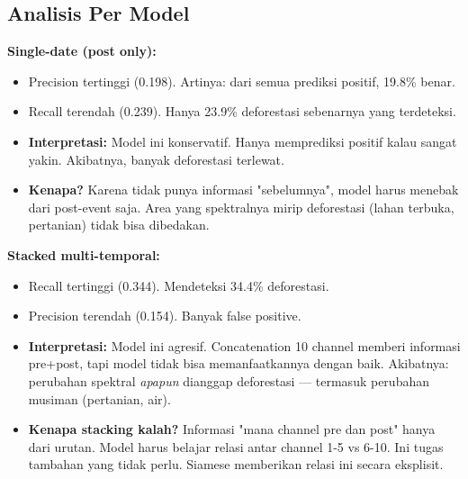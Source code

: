 \documentclass[10pt,a4paper,onecolumn]{article}
\begin{document}
\subsection{Analisis Per Model}

\textbf{Single-date (post only):}
\begin{itemize}[nosep]
    \item Precision tertinggi (0.198). Artinya: dari semua prediksi
          positif, 19.8\% benar.
    \item Recall terendah (0.239). Hanya 23.9\% deforestasi
          sebenarnya yang terdeteksi.
    \item \textbf{Interpretasi:} Model ini konservatif. Hanya
          memprediksi positif kalau sangat yakin. Akibatnya, banyak
          deforestasi terlewat.
    \item \textbf{Kenapa?} Karena tidak punya informasi "sebelumnya",
          model harus menebak dari post-event saja. Area yang
          spektralnya mirip deforestasi (lahan terbuka, pertanian)
          tidak bisa dibedakan.
\end{itemize}

\textbf{Stacked multi-temporal:}
\begin{itemize}[nosep]
    \item Recall tertinggi (0.344). Mendeteksi 34.4\% deforestasi.
    \item Precision terendah (0.154). Banyak false positive.
    \item \textbf{Interpretasi:} Model ini agresif. Concatenation
          10 channel memberi informasi pre+post, tapi model tidak
          bisa memanfaatkannya dengan baik. Akibatnya: perubahan
          spektral \textit{apapun} dianggap deforestasi — termasuk
          perubahan musiman (pertanian, air).
    \item \textbf{Kenapa stacking kalah?} Informasi "mana channel pre
          dan post" hanya dari urutan. Model harus belajar relasi
          antar channel 1-5 vs 6-10. Ini tugas tambahan yang tidak
          perlu. Siamese memberikan relasi ini secara eksplisit.
\end{itemize}
\end{document}

